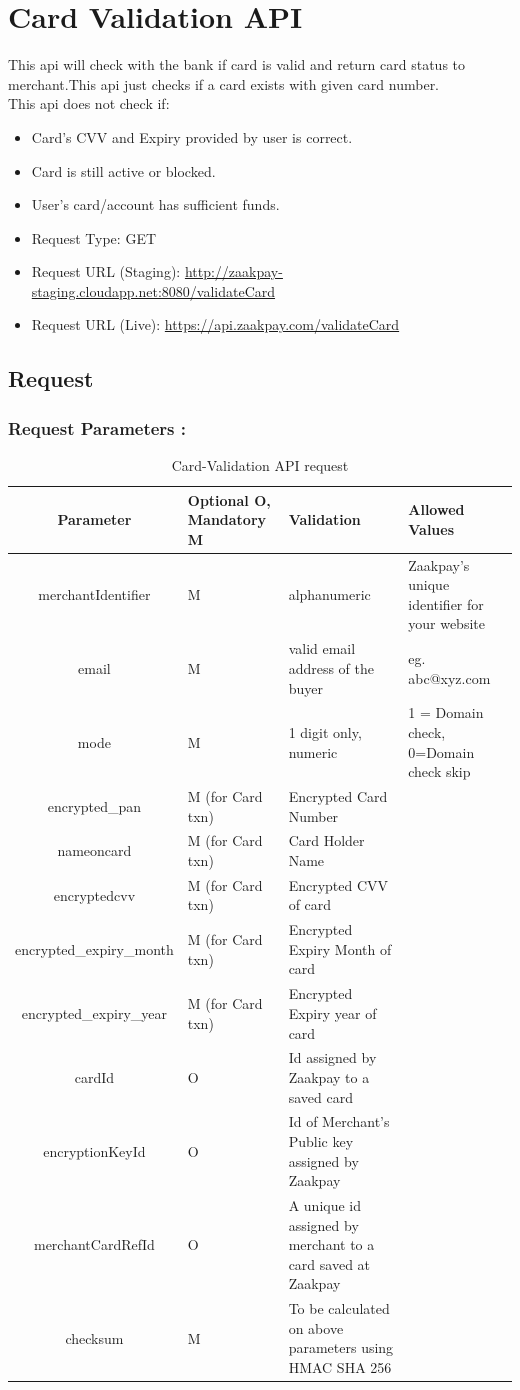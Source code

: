 \documentclass{article}
\begin{document}
 \newpage
 \section{Card Validation API}
 This api will check with the bank if card is valid and return card status to merchant.This api just checks if a card  exists with given card number. \\ This api does not check if:
 \begin{itemize}
\item Card’s CVV and Expiry provided by user is correct. 
\item Card is still active or blocked. 
\item User’s card/account has sufficient funds. 
\item Request Type:	GET 
\item Request URL (Staging): \url{http://zaakpay-staging.cloudapp.net:8080/validateCard}
\item Request URL (Live):	\url{https://api.zaakpay.com/validateCard}
\end{itemize}
\subsection{Request}
\subsubsection{Request Parameters :}
\begin{longtable}{||c|| p{2.09cm}|| p{5.5cm}| p{4.7cm}||}
   \caption{Card-Validation API request}\\
   \rowcolor{green!50}
\bfseries{Parameter} & \bfseries{Optional O, Mandatory M} & \bfseries{Validation} & \bfseries{Allowed Values} \\ \hline
merchantIdentifier & M & alphanumeric & Zaakpay's unique identifier for your website \\
email & M & valid email address of the buyer & eg. abc@xyz.com \\
mode & M & 1 digit only, numeric & 1 = Domain check, 0=Domain check skip\\
encrypted\_pan & M (for Card txn) & Encrypted Card Number &  \\
nameoncard & M (for Card txn) & Card Holder Name & \\
encryptedcvv & M (for Card txn) & Encrypted CVV of card & \\
encrypted\_expiry\_month & M (for Card txn) & Encrypted Expiry Month of card & \\
encrypted\_expiry\_year & M (for Card txn) & Encrypted Expiry year of card & \\

cardId & O & Id assigned by Zaakpay to a saved card & \\
encryptionKeyId & O & Id of Merchant’s Public key assigned by Zaakpay & \\
merchantCardRefId & O & A unique id assigned by merchant to a card saved at Zaakpay & \\
checksum & M & To be calculated on above parameters using HMAC SHA 256 & \\
\end{longtable}
\newpage
\end{document}

